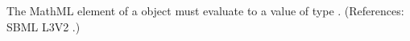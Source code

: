 The MathML  element of a \Trigger object must evaluate to a
value of type .  (References: SBML L3V2
.)
